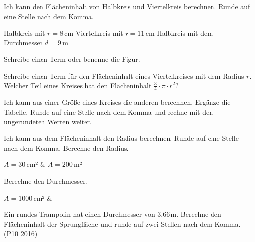 \begin{aufgabe}{Ich kann den Flächeninhalt von Halbkreis und Viertelkreis berechnen. Runde auf eine Stelle nach dem Komma.}
\begin{kreis}[1.3]\end{kreis}\hspace{1.5cm}\begin{kreis}[1.3]\end{kreis}

\begin{teile}
\teil Halbkreis mit $r = 8$\,cm \quad {}
\teil Viertelkreis mit $r = 11$\,cm \quad {}
\teil Halbkreis mit dem Durchmesser $d = 9$\,m \quad {}
\end{teile}
Schreibe einen Term oder benenne die Figur.
\begin{teile}
\teil Schreibe einen Term für den Flächeninhalt eines Viertelkreises mit dem Radius $r$.
\teil Welcher Teil eines Kreises hat den Flächeninhalt $\frac34 \cdot \pi \cdot r^2$?
\end{teile}
\end{aufgabe}

\begin{aufgabe}{Ich kann aus einer Größe eines Kreises die anderen berechnen. Ergänze die Tabelle. Runde auf eine Stelle nach dem Komma und rechne mit den ungerundeten Werten weiter.}
\end{aufgabe}

\begin{aufgabe}{Ich kann aus dem Flächeninhalt den Radius berechnen. Runde auf eine Stelle nach dem Komma.}
Berechne den Radius.
\begin{teilezwei}
\tz $A = 30$\,cm² \quad {} & \tz $A = 200$\,m² \quad {} \\
\end{teilezwei}
Berechne den Durchmesser.
\begin{teilezwei}
\tz $A = 1000$\,cm² \quad {} & \\
\end{teilezwei}
\begin{teile}
\teil Ein rundes Trampolin hat einen Durchmesser von 3,66\,m. Berechne den Flächeninhalt der Sprungfläche und runde auf zwei Stellen nach dem Komma. (P10 2016)
\end{teile}
\end{aufgabe}

